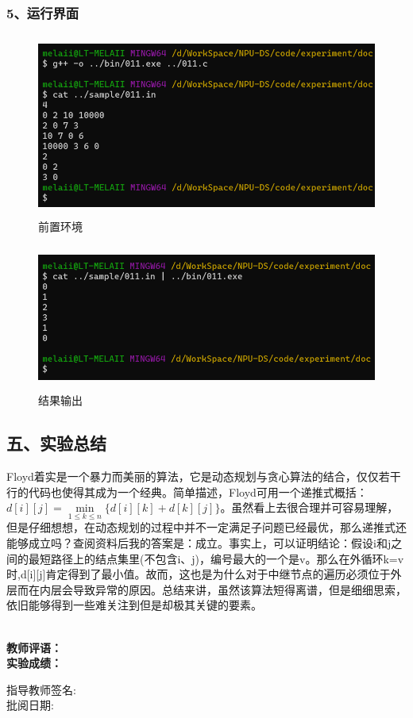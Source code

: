 \documentclass[UTF8, a4paper]{ctexart}
\begin{document}
\subsubsection*{5、运行界面}
\begin{figure}[H]
	\begin{minipage}[t]{\linewidth}
		\centering
		\includegraphics[width=125mm,height=60mm]{./assets/DS11-2}
		\caption{前置环境}
	\end{minipage}
\end{figure}
\begin{figure}[H]
	\begin{minipage}[t]{\linewidth}
		\centering
		\includegraphics[width=125mm,height=48mm]{./assets/DS11-3}
		\caption{结果输出}
	\end{minipage}
\end{figure}

\subsection*{五、实验总结}
Floyd着实是一个暴力而美丽的算法，它是动态规划与贪心算法的结合，仅仅若干行的代码也使得其成为一个经典。简单描述，Floyd可用一个递推式概括：$d[i][j]=\mathop{min}\limits_{1\leq{k}\leq{n}}\{d[i][k]+d[k][j]\}$。虽然看上去很合理并可容易理解，但是仔细想想，在动态规划的过程中并不一定满足子问题已经最优，那么递推式还能够成立吗？查阅资料后我的答案是：成立。事实上，可以证明结论：假设i和j之间的最短路径上的结点集里(不包含i、j)，编号最大的一个是v。那么在外循环k=v时,d[i][j]肯定得到了最小值。故而，这也是为什么对于中继节点的遍历必须位于外层而在内层会导致异常的原因。总结来讲，虽然该算法短得离谱，但是细细思索，依旧能够得到一些难关注到但是却极其关键的要素。

~\\
\textbf{教师评语：}
~\\
\textbf{实验成绩：}

\begin{flushright}
\mbox{指导教师签名:\qquad\qquad} \\
\mbox{批阅日期:\qquad\qquad}
\end{flushright}
\end{document}
